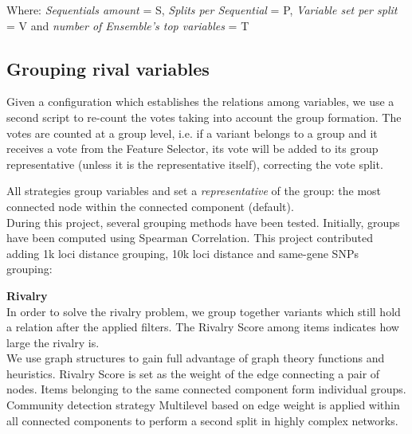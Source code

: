 Where: \textit{Sequentials amount} = S, \textit{Splits per Sequential} = P, \textit{Variable set per split} = V and \textit{number of Ensemble’s top variables} = T


\subsection{Grouping rival variables}
Given a configuration which establishes the relations among variables, we use a second script to re-count the votes taking into account the group formation. The votes are counted at a group level, i.e. if a variant belongs to a group and it receives a vote from the Feature Selector, its vote will be added to its group representative (unless it is the representative itself), correcting the vote split. 

All strategies group variables and set a \textit{representative} of the group: the most connected node within the connected component (default).
\\

During this project, several grouping methods have been tested. Initially, groups have been computed using Spearman Correlation. This project contributed adding 1k loci distance grouping, 10k loci distance and same-gene SNPs grouping:

\textbf{Rivalry}\\
In order to solve the rivalry problem, we group together variants which still hold a relation after the applied filters. The Rivalry Score among items indicates how large the rivalry is.
\\

We use graph structures to gain full advantage of graph theory functions and heuristics. Rivalry Score is set as the weight of the edge connecting a pair of nodes. 
Items belonging to the same connected component form individual groups. Community detection strategy Multilevel \cite{Blondel2008FastNetworks} based on edge weight is applied within all connected components to perform a second split in highly complex networks.
\\

